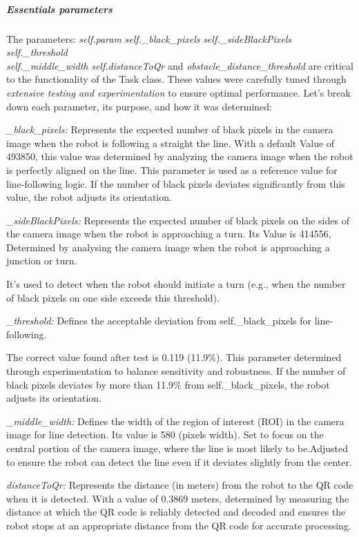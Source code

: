 \documentclass[../../main]{subfiles}
\begin{document}
\newpage

\subparagraph{Essentials parameters}

The parameters: \emph{self.param} \emph{self.\_black\_pixels} 
\emph{self.\_sideBlackPixels} \emph{self.\_threshold} \\ \emph{self.\_middle\_width}
\emph{self.distanceToQr} and \emph{obstacle\_distance\_threshold}  are critical to
the functionality of the Task class. These values were carefully tuned
through \emph{extensive testing and experimentation} to ensure optimal
performance. Let's break down each parameter, its purpose, and how it
was determined:

\emph{\_black\_pixels:} Represents the expected number of black pixels
in the camera image when the robot is following a straight the line.
With a default Value of 493850, this value was determined by analyzing
the camera image when the robot is perfectly aligned on the line. This
parameter is used as a reference value for line-following logic. If the
number of black pixels deviates significantly from this value, the robot
adjusts its orientation.

\emph{\_sideBlackPixels:} Represents the expected number of black pixels
on the sides of the camera image when the robot is approaching a turn.
Its Value is 414556, Determined by analysing the camera image when the
robot is approaching a junction or turn.

It's used to detect when the robot should initiate a turn (e.g., when
the number of black pixels on one side exceeds this threshold).

\emph{\_threshold:} Defines the acceptable deviation from
self.\_black\_pixels for line-following.

The correct value found after test is 0.119 (11.9\%). This parameter
determined through experimentation to balance sensitivity and
robustness. If the number of black pixels deviates by more than 11.9\%
from self.\_black\_pixels, the robot adjusts its orientation.

\emph{\_middle\_width:} Defines the width of the region of interest
(ROI) in the camera image for line detection. Its value is 580 (pixels
width)\emph{.} Set to focus on the central portion of the camera image,
where the line is most likely to be.Adjusted to ensure the robot can
detect the line even if it deviates slightly from the center.

\emph{distanceToQr:} Represents the distance (in meters) from the robot
to the QR code when it is detected. With a value of 0.3869 meters,
determined by measuring the distance at which the QR code is reliably
detected and decoded and ensures the robot stops at an appropriate
distance from the QR code for accurate processing.
\end{document}
